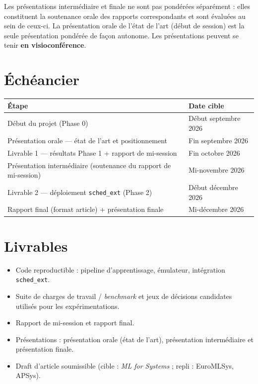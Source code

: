 \documentclass[11pt,a4paper]{article}
\begin{document}
\medskip
\noindent\small Les présentations intermédiaire et finale ne sont pas pondérées
séparément : elles constituent la soutenance orale des rapports correspondants
et sont évaluées au sein de ceux-ci. La présentation orale de l'état de l'art
(début de session) est la seule présentation pondérée de façon autonome. Les
présentations peuvent se tenir \textbf{en visioconférence}.

\section{Échéancier}
\noindent
\renewcommand{\arraystretch}{1.3}
\begin{tabularx}{\linewidth}{@{}Xl@{}}
  \toprule
  \textbf{Étape} & \textbf{Date cible} \\
  \midrule
  Début du projet (Phase 0)                              & Début septembre 2026 \\
  Présentation orale — état de l'art et positionnement   & Fin septembre 2026 \\
  Livrable 1 — résultats Phase 1 + rapport de mi-session & Fin octobre 2026 \\
  Présentation intermédiaire (soutenance du rapport de mi-session) & Mi-novembre 2026 \\
  Livrable 2 — déploiement \texttt{sched\_ext} (Phase 2) & Début décembre 2026 \\
  Rapport final (format article) + présentation finale   & Mi-décembre 2026 \\
  \bottomrule
\end{tabularx}

\section{Livrables}
\begin{itemize}[leftmargin=1.5em,itemsep=2pt]
  \item Code reproductible : pipeline d'apprentissage, émulateur, intégration
    \texttt{sched\_ext}.
  \item Suite de charges de travail / \emph{benchmark} et jeux de décisions
    candidates utilisés pour les expérimentations.
  \item Rapport de mi-session et rapport final.
  \item Présentations : présentation orale (état de l'art), présentation
    intermédiaire et présentation finale.
  \item Draft d'article soumissible (cible : \emph{ML for Systems} ;
    repli : EuroMLSys, APSys).
\end{itemize}
\end{document}

